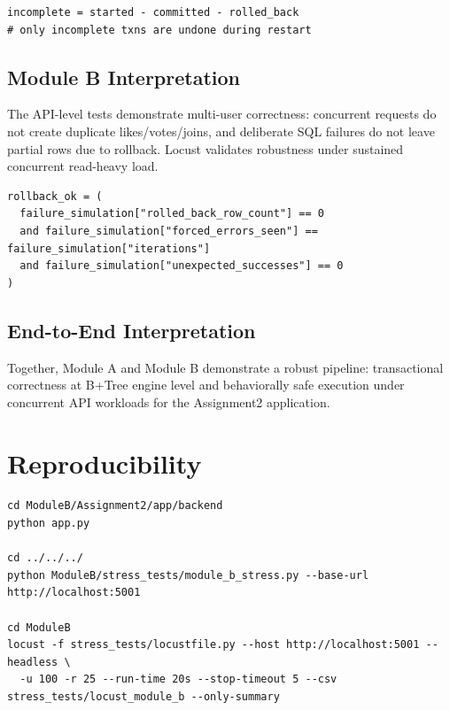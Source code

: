 \documentclass[12pt,a4paper]{article}
\begin{document}
\begin{lstlisting}[style=python, caption={Interpretation anchor: recovery partitioning logic}]
incomplete = started - committed - rolled_back
# only incomplete txns are undone during restart
\end{lstlisting}

\subsection{Module B Interpretation}
The API-level tests demonstrate multi-user correctness: concurrent requests do not create duplicate likes/votes/joins, and deliberate SQL failures do not leave partial rows due to rollback. Locust validates robustness under sustained concurrent read-heavy load.

\begin{lstlisting}[style=python, caption={Interpretation anchor: rollback verification in module\_b\_stress.py}]
rollback_ok = (
  failure_simulation["rolled_back_row_count"] == 0
  and failure_simulation["forced_errors_seen"] == failure_simulation["iterations"]
  and failure_simulation["unexpected_successes"] == 0
)
\end{lstlisting}

\subsection{End-to-End Interpretation}
Together, Module A and Module B demonstrate a robust pipeline: transactional correctness at B+Tree engine level and behaviorally safe execution under concurrent API workloads for the Assignment2 application.

\section{Reproducibility}

\begin{lstlisting}[basicstyle=\ttfamily\small]
cd ModuleB/Assignment2/app/backend
python app.py

cd ../../../
python ModuleB/stress_tests/module_b_stress.py --base-url http://localhost:5001

cd ModuleB
locust -f stress_tests/locustfile.py --host http://localhost:5001 --headless \
  -u 100 -r 25 --run-time 20s --stop-timeout 5 --csv stress_tests/locust_module_b --only-summary
\end{lstlisting}
\end{document}
